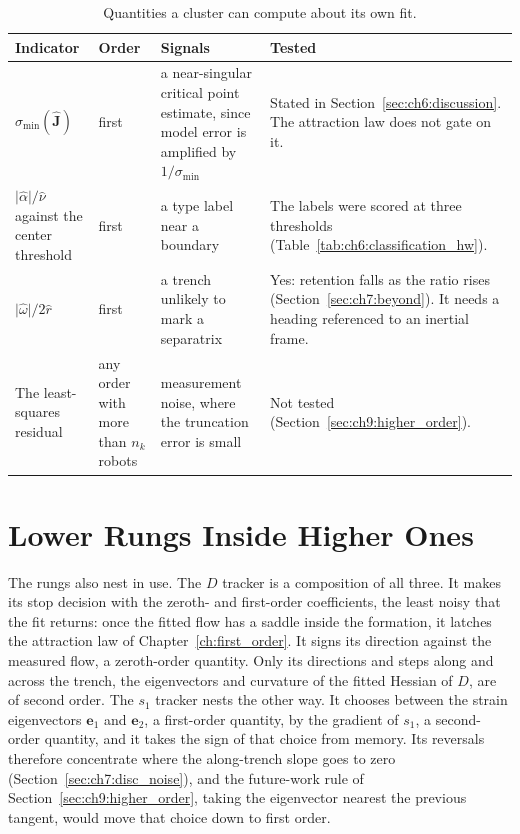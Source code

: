 \begin{table}[htbp]
\centering
\caption{Quantities a cluster can compute about its own fit.}
\label{tab:ch8:indicators}
\small
\begin{tabular}{>{\raggedright\arraybackslash}p{3.3cm} >{\raggedright\arraybackslash}p{1.7cm} >{\raggedright\arraybackslash}p{3.4cm} >{\raggedright\arraybackslash}p{4.0cm}}
\hline
Indicator & Order & Signals & Tested \\
\hline
$\sigma_{\min}(\hat{\mathbf{J}})$ & first & a near-singular critical point estimate, since model error is amplified by $1/\sigma_{\min}$ & Stated in Section~\ref{sec:ch6:discussion}. The attraction law does not gate on it. \\
$\lvert\hat{\alpha}\rvert/\hat{\nu}$ against the center threshold & first & a type label near a boundary & The labels were scored at three thresholds (Table~\ref{tab:ch6:classification_hw}). \\
$\lvert\hat{\omega}\rvert/2\hat{r}$ & first & a trench unlikely to mark a separatrix & Yes: retention falls as the ratio rises (Section~\ref{sec:ch7:beyond}). It needs a heading referenced to an inertial frame. \\
The least-squares residual & any order with more than $n_k$ robots & measurement noise, where the truncation error is small & Not tested (Section~\ref{sec:ch9:higher_order}). \\
\hline
\end{tabular}
\end{table}

\section{Lower Rungs Inside Higher Ones}
\label{sec:ch8:nesting}

The rungs also nest in use. The $D$ tracker is a composition of all three.
It makes its stop decision with the zeroth- and first-order coefficients,
the least noisy that the fit returns: once the fitted flow has a saddle
inside the formation, it latches the attraction law of
Chapter~\ref{ch:first_order}. It signs its direction against the measured
flow, a zeroth-order quantity. Only its directions and steps along and
across the trench, the eigenvectors and curvature of the fitted Hessian of
$D$, are of second order. The $s_1$ tracker nests the other way. It chooses
between the strain eigenvectors $\mathbf{e}_1$ and $\mathbf{e}_2$, a
first-order quantity, by the gradient of $s_1$, a second-order quantity,
and it takes the sign of that choice from memory. Its reversals therefore
concentrate where the along-trench slope goes to zero
(Section~\ref{sec:ch7:disc_noise}), and the future-work rule of
Section~\ref{sec:ch9:higher_order}, taking the eigenvector nearest the
previous tangent, would move that choice down to first order.

